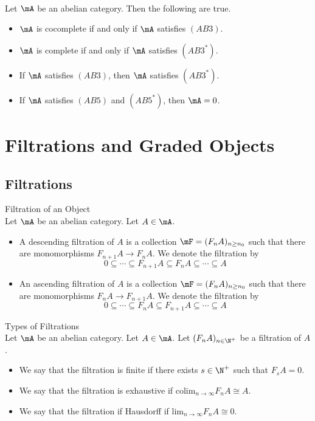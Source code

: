 \documentclass[a4paper]{article}
\begin{document}
\begin{prp}{}{}\\
Let $\mA$ be an abelian category. Then the following are true. 
\begin{itemize}
\item $\mA$ is cocomplete if and only if $\mA$ satisfies $(AB3)$. 
\item $\mA$ is complete if and only if $\mA$ satisfies $(AB3^\ast)$. 
\item If $\mA$ satisfies $(AB3)$, then $\mA$ satisfies $(AB3^\ast)$. 
\item If $\mA$ satisfies $(AB5)$ and $(AB5^\ast)$, then $\mA=0$. 
\end{itemize}
\end{prp}

\pagebreak
\section{Filtrations and Graded Objects}
\subsection{Filtrations}
\begin{defn}{Filtration of an Object}{}\\
Let $\mA$ be an abelian category. Let $A\in\mA$. 
\begin{itemize}
\item A descending filtration of $A$ is a collection $\mF=(F_nA)_{n\geq n_0}$ such that there are monomorphisms $F_{n+1}A\to F_nA$. We denote the filtration by $$0\subseteq\cdots\subseteq F_{n+1}A\subseteq F_nA\subseteq\cdots\subseteq A$$
\item An ascending filtration of $A$ is a collection $\mF=(F_nA)_{n\geq n_0}$ such that there are monomorphisms $F_nA\to F_{n+1}A$. We denote the filtration by $$0\subseteq\cdots\subseteq F_nA\subseteq F_{n+1}A\subseteq\cdots\subseteq A$$
\end{itemize}
\end{defn}

\begin{defn}{Types of Filtrations}{}\\
Let $\mA$ be an abelian category. Let $A\in\mA$. Let $(F_nA)_{n\in\N^+}$ be a filtration of $A$. 
\begin{itemize}
\item We say that the filtration is finite if there exists $s\in\N^+$ such that $F_sA=0$. 
\item We say that the filtration is exhaustive if $\text{colim}_{n\to\infty}F_nA\cong A$. 
\item We say that the filtration if Hausdorff if $\text{lim}_{n\to\infty}F_nA\cong 0$. 
\end{itemize}
\end{defn}
\end{document}
